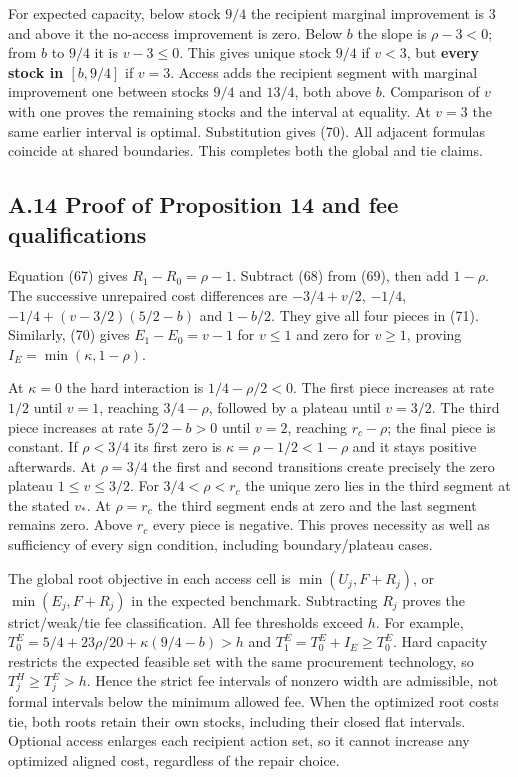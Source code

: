 \documentclass[
  11pt,
  a4paper,
]{article}
\begin{document}
For expected capacity, below stock \(9/4\) the recipient marginal
improvement is 3 and above it the no-access improvement is zero. Below
\(b\) the slope is \(\rho-3<0\); from \(b\) to \(9/4\) it is
\(v-3\leq0\). This gives unique stock \(9/4\) if \(v<3\), but
\textbf{every stock in \([b,9/4]\)} if \(v=3\). Access adds the
recipient segment with marginal improvement one between stocks \(9/4\)
and \(13/4\), both above \(b\). Comparison of \(v\) with one proves the
remaining stocks and the interval at equality. At \(v=3\) the same
earlier interval is optimal. Substitution gives (70). All adjacent
formulas coincide at shared boundaries. This completes both the global
and tie claims.

\hypertarget{a.14-proof-of-proposition-14-and-fee-qualifications}{%
\subsection{A.14 Proof of Proposition 14 and fee
qualifications}\label{a.14-proof-of-proposition-14-and-fee-qualifications}}

Equation (67) gives \(R_1-R_0=\rho-1\). Subtract (68) from (69), then
add \(1-\rho\). The successive unrepaired cost differences are
\(-3/4+v/2\), \(-1/4\), \(-1/4+(v-3/2)(5/2-b)\) and \(1-b/2\). They give
all four pieces in (71). Similarly, (70) gives \(E_1-E_0=v-1\) for
\(v\leq1\) and zero for \(v\geq1\), proving \(I_E=\min(\kappa,1-\rho)\).

At \(\kappa=0\) the hard interaction is \(1/4-\rho/2<0\). The first
piece increases at rate \(1/2\) until \(v=1\), reaching \(3/4-\rho\),
followed by a plateau until \(v=3/2\). The third piece increases at rate
\(5/2-b>0\) until \(v=2\), reaching \(r_c-\rho\); the final piece is
constant. If \(\rho<3/4\) its first zero is \(\kappa=\rho-1/2<1-\rho\)
and it stays positive afterwards. At \(\rho=3/4\) the first and second
transitions create precisely the zero plateau \(1\leq v\leq3/2\). For
\(3/4<\rho<r_c\) the unique zero lies in the third segment at the stated
\(v_*\). At \(\rho=r_c\) the third segment ends at zero and the last
segment remains zero. Above \(r_c\) every piece is negative. This proves
necessity as well as sufficiency of every sign condition, including
boundary/plateau cases.

The global root objective in each access cell is \(\min(U_j,F+R_j)\), or
\(\min(E_j,F+R_j)\) in the expected benchmark. Subtracting \(R_j\)
proves the strict/weak/tie fee classification. All fee thresholds exceed
\(h\). For example, \(T^E_0=5/4+23\rho/20+\kappa(9/4-b)>h\) and
\(T^E_1=T^E_0+I_E\geq T^E_0\). Hard capacity restricts the expected
feasible set with the same procurement technology, so
\(T^H_j\geq T^E_j>h\). Hence the strict fee intervals of nonzero width
are admissible, not formal intervals below the minimum allowed fee. When
the optimized root costs tie, both roots retain their own stocks,
including their closed flat intervals. Optional access enlarges each
recipient action set, so it cannot increase any optimized aligned cost,
regardless of the repair choice.
\end{document}

